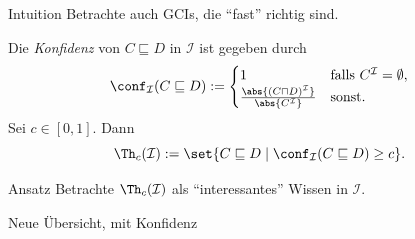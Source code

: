 \documentclass[ngerman]{beamer}
\begin{document}
\begin{frame}

  \onslide<+->

  \begin{block}{Intuition}
    Betrachte auch GCIs, die \enquote{fast} richtig sind.
  \end{block}

  \onslide<+->
  \begin{Definition}
    Die \emph{Konfidenz} von $C \sqsubseteq D$ in $\mathcal{I}$ ist gegeben durch
    \begin{equation*}
      \conf_{\mathcal{I}}(C \sqsubseteq D) :=
      \begin{cases}
        1 & \text{falls } C^{\mathcal{I}} = \emptyset,\\
        \frac{\abs{(C \sqcap D)^{\mathcal{I}}}}{\abs{C^{\mathcal{I}}}} & \text{sonst}.
      \end{cases}
    \end{equation*}
    \onslide<+->%
    Sei $c \in [0, 1]$.  Dann
    \begin{equation*}
      \Th_c(\mathcal{I}) := \set{ C \sqsubseteq D \mid \conf_{\mathcal{I}}(C \sqsubseteq
        D) \ge c}.
    \end{equation*}
  \end{Definition}

  \onslide<+->

  \begin{block}{Ansatz}
    Betrachte $\Th_{c}(\mathcal{I})$ als \enquote{interessantes} Wissen in $\mathcal{I}$.
  \end{block}

\end{frame}

\begin{frame}[label=current]

  \onslide<+->
  
  Neue Übersicht, mit Konfidenz
\end{frame}
\end{document}
